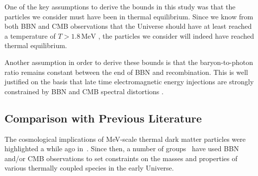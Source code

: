 \documentclass[notitlepage,letterpaper,natbib,aps,prd,onecolumn,amsmath,amsfonts,nofootinbib,preprintnumbers,superscriptaddress,secnumarabic,groupedaddress]{revtex4-1}
\begin{document}
One of the key assumptions to derive the bounds in this study was that the particles we consider must have been in thermal equilibrium. Since we know from both BBN and CMB observations that the Universe should have at least reached a temperature of $T > 1.8\,\text{MeV}$ \cite{deSalas:2015glj,Hasegawa:2019jsa}, the particles we consider will indeed have reached thermal equilibrium. 

Another assumption in order to derive these bounds is that the baryon-to-photon ratio remains constant between the end of BBN and recombination. This is well justified on the basis that late time electromagnetic energy injections are strongly constrained by BBN \cite{Kawasaki:2017bqm,Hufnagel:2018bjp,Forestell:2018txr} and CMB spectral distortions \cite{Hu:1992dc,Hu:1993gc}.

\subsection{Comparison with Previous Literature} 

The cosmological implications of MeV-scale thermal dark matter particles were highlighted a while ago in~\cite{Kolb:1986nf}. Since then, a number of groups~\cite{Kolb:1986nf,Serpico:2004nm,Boehm:2013jpa,Nollett:2013pwa,Nollett:2014lwa,Boehm:2012gr,Ho:2012ug,Wilkinson:2016gsy,Depta:2019lbe,Escudero:2018mvt} have used BBN and/or CMB observations to set constraints on the masses and properties of various thermally coupled species in the early Universe. 
\end{document}
